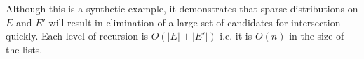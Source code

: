 Although this is a synthetic example, it demonstrates that sparse distributions on $E$ and $E'$ will result in elimination of a large set of candidates for intersection quickly. Each level of recursion is $O(|E|+|E'|)$ i.e. it is $O(n)$ in the size of the lists.

